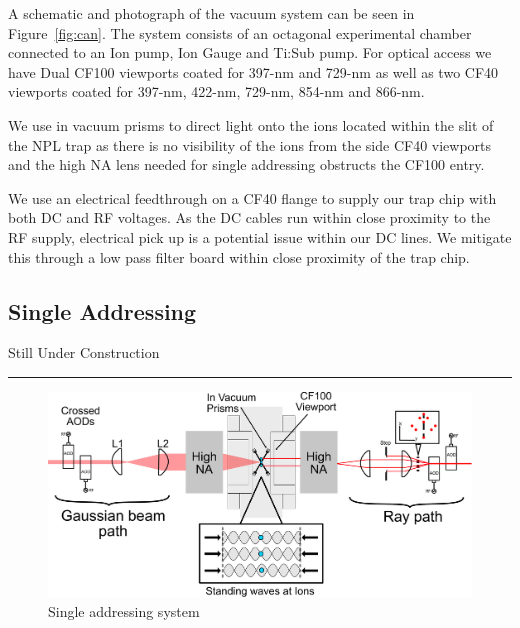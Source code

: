 \documentclass[12pt]{iopart}
\begin{document}
A schematic and photograph of the vacuum system can be seen in
Figure~\ref{fig:can}. The system consists of an octagonal experimental
chamber connected to an Ion pump, Ion Gauge and Ti:Sub pump. For
optical access we have Dual CF100 viewports coated for 397-nm and
729-nm as well as two CF40 viewports coated for 397-nm, 422-nm,
729-nm, 854-nm and 866-nm.

We use in vacuum prisms to direct light onto the ions located within
the slit of the NPL trap as there is no visibility of the ions from
the side CF40 viewports and the high NA lens needed for single
addressing obstructs the CF100 entry.

We use an electrical feedthrough on a CF40 flange to supply our trap
chip with both DC and RF voltages. As the DC cables run within close
proximity to the RF supply, electrical pick up is a potential issue
within our DC lines. We mitigate this through a low pass filter board
within close proximity of the trap chip.


\subsection{Single Addressing}

\begin{center}
Still Under Construction \\
\end{center}
\hrule\vspace{1em}

\begin{figure}
  \begin{center}
   \noindent\includegraphics[width=\linewidth]{figures/vac_can_AOD_small.pdf}
  \end{center}
  \caption{Single addressing system}
  \label{fig:AOD}
\end{figure}
\end{document}
